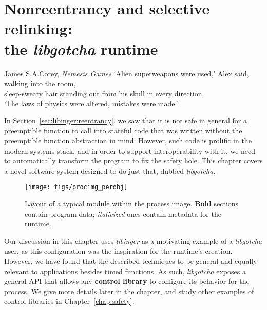 \chapter{Nonreentrancy and selective relinking: \\ the \textit{libgotcha} runtime}
\label{chap:libgotcha}

\ifdefined\chapquotes
\vspace{-1in}
\begin{chapquote}[1.5in]{James S.\@ A.\@ Corey, \textit{Nemesis Games}}
`Alien superweapons were used,' Alex said, walking into the room, \\
sleep-sweaty hair standing out from his skull in every direction. \\
`The laws of physics were altered, mistakes were made.'
\end{chapquote}
\fi

In Section~\ref{sec:libinger:reentrancy}, we saw that it is not safe in general for a
preemptible function to call into stateful code that was written without the
preemptible function abstraction in mind.  However, such code is prolific in the
modern systems stack, and in order to support interoperability with it, we need to
automatically transform the program to fix the safety hole.  This chapter covers a
novel software system designed to do just that, dubbed \textit{libgotcha}.

\begin{figure}
\begin{center}
\texttt{[image: figs/procimg\_perobj]}
\end{center}
\caption{Layout of a typical module within the process image.  \textbf{Bold} sections
contain program data; \textit{italicized} ones contain metadata for the runtime.}
\label{fig:procimgobj}
\end{figure}

\begin{promotesubsections}
\begin{swallowsections}

\end{swallowsections}
\end{promotesubsections}
\hspace{-2.5em}
Our discussion in this chapter uses \textit{libinger} as a motivating example of a
\textit{libgotcha} user, as this configuration was the inspiration for the runtime's
creation.  However, we have found that the described techniques to be general and
equally relevant to applications besides timed functions.  As such,
\textit{libgotcha} exposes a general API that allows any \textbf{control library} to
configure its behavior for the process.  We give more details later in the chapter,
and study other examples of control libraries in Chapter~\ref{chap:safety}.


